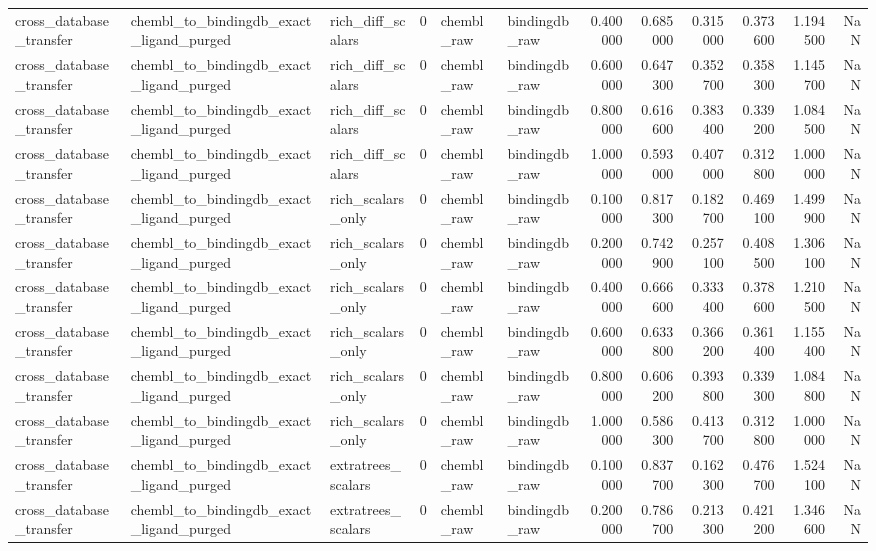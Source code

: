 \begin{longtable}{lllrllrrrrrr}
cross\_database\_transfer & chembl\_to\_bindingdb\_exact\_ligand\_purged & rich\_diff\_scalars & 0 & chembl\_raw & bindingdb\_raw & 0.400000 & 0.685000 & 0.315000 & 0.373600 & 1.194500 & NaN \\
cross\_database\_transfer & chembl\_to\_bindingdb\_exact\_ligand\_purged & rich\_diff\_scalars & 0 & chembl\_raw & bindingdb\_raw & 0.600000 & 0.647300 & 0.352700 & 0.358300 & 1.145700 & NaN \\
cross\_database\_transfer & chembl\_to\_bindingdb\_exact\_ligand\_purged & rich\_diff\_scalars & 0 & chembl\_raw & bindingdb\_raw & 0.800000 & 0.616600 & 0.383400 & 0.339200 & 1.084500 & NaN \\
cross\_database\_transfer & chembl\_to\_bindingdb\_exact\_ligand\_purged & rich\_diff\_scalars & 0 & chembl\_raw & bindingdb\_raw & 1.000000 & 0.593000 & 0.407000 & 0.312800 & 1.000000 & NaN \\
cross\_database\_transfer & chembl\_to\_bindingdb\_exact\_ligand\_purged & rich\_scalars\_only & 0 & chembl\_raw & bindingdb\_raw & 0.100000 & 0.817300 & 0.182700 & 0.469100 & 1.499900 & NaN \\
cross\_database\_transfer & chembl\_to\_bindingdb\_exact\_ligand\_purged & rich\_scalars\_only & 0 & chembl\_raw & bindingdb\_raw & 0.200000 & 0.742900 & 0.257100 & 0.408500 & 1.306100 & NaN \\
cross\_database\_transfer & chembl\_to\_bindingdb\_exact\_ligand\_purged & rich\_scalars\_only & 0 & chembl\_raw & bindingdb\_raw & 0.400000 & 0.666600 & 0.333400 & 0.378600 & 1.210500 & NaN \\
cross\_database\_transfer & chembl\_to\_bindingdb\_exact\_ligand\_purged & rich\_scalars\_only & 0 & chembl\_raw & bindingdb\_raw & 0.600000 & 0.633800 & 0.366200 & 0.361400 & 1.155400 & NaN \\
cross\_database\_transfer & chembl\_to\_bindingdb\_exact\_ligand\_purged & rich\_scalars\_only & 0 & chembl\_raw & bindingdb\_raw & 0.800000 & 0.606200 & 0.393800 & 0.339300 & 1.084800 & NaN \\
cross\_database\_transfer & chembl\_to\_bindingdb\_exact\_ligand\_purged & rich\_scalars\_only & 0 & chembl\_raw & bindingdb\_raw & 1.000000 & 0.586300 & 0.413700 & 0.312800 & 1.000000 & NaN \\
cross\_database\_transfer & chembl\_to\_bindingdb\_exact\_ligand\_purged & extratrees\_scalars & 0 & chembl\_raw & bindingdb\_raw & 0.100000 & 0.837700 & 0.162300 & 0.476700 & 1.524100 & NaN \\
cross\_database\_transfer & chembl\_to\_bindingdb\_exact\_ligand\_purged & extratrees\_scalars & 0 & chembl\_raw & bindingdb\_raw & 0.200000 & 0.786700 & 0.213300 & 0.421200 & 1.346600 & NaN \\

\end{longtable}

